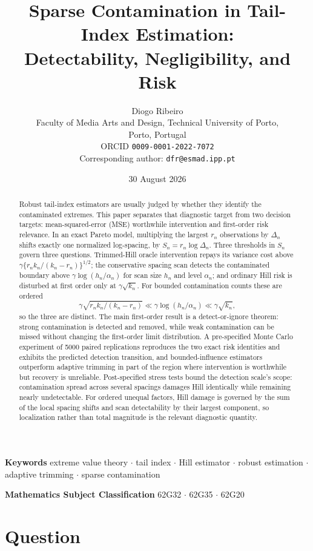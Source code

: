 \documentclass[11pt]{article}
\title{Sparse Contamination in Tail-Index Estimation:\\
Detectability, Negligibility, and Risk}
\author{%
Diogo Ribeiro\\[4pt]
\normalsize Faculty of Media Arts and Design, Technical University of Porto,\\
\normalsize Porto, Portugal\\[2pt]
\normalsize ORCID \texttt{0009-0001-2022-7072}\\[2pt]
\normalsize Corresponding author: \texttt{dfr@esmad.ipp.pt}%
}
\date{30 August 2026}
\begin{document}
\maketitle

\begin{abstract}
Robust tail-index estimators are usually judged by whether they identify the
contaminated extremes.  This paper separates that diagnostic target from two
decision targets: mean-squared-error (MSE) worthwhile intervention and
first-order risk relevance.
In an exact Pareto model, multiplying the largest $r_n$ observations by
$\Delta_n$ shifts exactly one normalized log-spacing, by
$S_n=r_n\log\Delta_n$.  Three thresholds in $S_n$ govern three questions.
Trimmed-Hill oracle intervention repays its variance cost above
$\gamma\{r_nk_n/(k_n-r_n)\}^{1/2}$; the conservative
spacing scan detects the contaminated boundary above $\gamma\log(h_n/\alpha_n)$
for scan size $h_n$ and level $\alpha_n$; and ordinary
Hill risk is disturbed at first order only at $\gamma\sqrt{k_n}$.  For bounded
contamination counts these are ordered
\[
  \gamma\sqrt{r_nk_n/(k_n-r_n)}
  \ll
  \gamma\log(h_n/\alpha_n)
  \ll
  \gamma\sqrt{k_n},
\]
so the three are distinct.  The main first-order result is a
detect-or-ignore theorem: strong contamination is detected and removed, while
weak contamination can be missed without changing the first-order limit
distribution.  A pre-specified Monte Carlo experiment of 5000 paired
replications reproduces the two exact risk identities and exhibits the
predicted detection transition, and bounded-influence estimators outperform
adaptive trimming in part of the region where intervention is worthwhile but
recovery is unreliable.  Post-specified stress tests bound the detection
scale's scope: contamination spread across several
spacings damages Hill identically while remaining nearly undetectable.  For
ordered unequal factors, Hill damage is governed by the sum of the local
spacing shifts and scan detectability by their largest component, so
localization rather than total magnitude is the relevant diagnostic quantity.
\end{abstract}

\noindent\textbf{Keywords} extreme value theory $\cdot$ tail index $\cdot$
Hill estimator $\cdot$ robust estimation $\cdot$ adaptive trimming $\cdot$
sparse contamination

\medskip
\noindent\textbf{Mathematics Subject Classification} 62G32 $\cdot$ 62G35
$\cdot$ 62G20

\section{Question}
\end{document}
